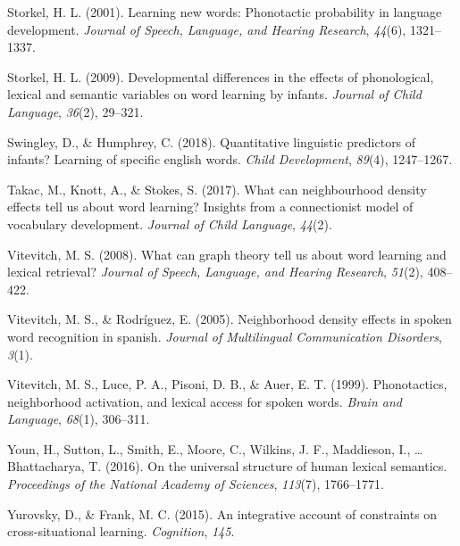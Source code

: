 \documentclass[english,floatsintext,man]{apa6}
\theoremstyle{definition}
\theoremstyle{definition}
\theoremstyle{definition}
\theoremstyle{remark}
\begin{document}
\hypertarget{ref-storkel2001}{}
Storkel, H. L. (2001). Learning new words: Phonotactic probability in
language development. \emph{Journal of Speech, Language, and Hearing
Research}, \emph{44}(6), 1321--1337.

\hypertarget{ref-storkel2009}{}
Storkel, H. L. (2009). Developmental differences in the effects of
phonological, lexical and semantic variables on word learning by
infants. \emph{Journal of Child Language}, \emph{36}(2), 29--321.

\hypertarget{ref-swingley2018}{}
Swingley, D., \& Humphrey, C. (2018). Quantitative linguistic predictors
of infants? Learning of specific english words. \emph{Child
Development}, \emph{89}(4), 1247--1267.

\hypertarget{ref-takac2017}{}
Takac, M., Knott, A., \& Stokes, S. (2017). What can neighbourhood
density effects tell us about word learning? Insights from a
connectionist model of vocabulary development. \emph{Journal of Child
Language}, \emph{44}(2).

\hypertarget{ref-vitevitch2008}{}
Vitevitch, M. S. (2008). What can graph theory tell us about word
learning and lexical retrieval? \emph{Journal of Speech, Language, and
Hearing Research}, \emph{51}(2), 408--422.

\hypertarget{ref-vitevitch2005}{}
Vitevitch, M. S., \& Rodríguez, E. (2005). Neighborhood density effects
in spoken word recognition in spanish. \emph{Journal of Multilingual
Communication Disorders}, \emph{3}(1).

\hypertarget{ref-vitevitch1999}{}
Vitevitch, M. S., Luce, P. A., Pisoni, D. B., \& Auer, E. T. (1999).
Phonotactics, neighborhood activation, and lexical access for spoken
words. \emph{Brain and Language}, \emph{68}(1), 306--311.

\hypertarget{ref-youn2016}{}
Youn, H., Sutton, L., Smith, E., Moore, C., Wilkins, J. F., Maddieson,
I., \ldots{} Bhattacharya, T. (2016). On the universal structure of
human lexical semantics. \emph{Proceedings of the National Academy of
Sciences}, \emph{113}(7), 1766--1771.

\hypertarget{ref-yurovsky2015}{}
Yurovsky, D., \& Frank, M. C. (2015). An integrative account of
constraints on cross-situational learning. \emph{Cognition}, \emph{145}.
\end{document}
